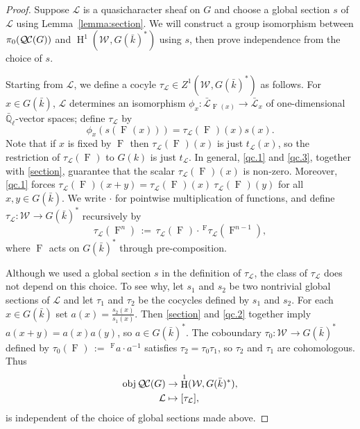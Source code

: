 \documentclass{amsart}
\theoremstyle{plain}
\theoremstyle{definition}
\theoremstyle{remark}
\newcommand{\EE}{\mathbb{\bar Q}_\ell}
\newcommand{\bFq}{\bar{k}}
\newcommand{\Weil}[1]{\mathcal{W}_{#1}}
\newcommand{\Frob}[1]{\operatorname{F}_{#1}}
\DeclareMathOperator{\Hh}{H}
\DeclareMathOperator{\obj}{obj}
\newcommand{\ceq}{{\, :=\, }}
\newcommand{\qcs}[1]{{\mathcal{#1}}}
\newcommand{\gqcs}[1]{{\mathcal{\bar #1}}}
\newcommand{\QC}{{\mathcal{Q\hskip-0.8pt C}}}
\newcommand{\QCiso}[1]{\pi_0 (\QC(#1))}
\newcommand{\trFrob}[1]{t_{#1}}
\begin{document}
\begin{proof}
  Suppose $\qcs{L}$ is a quasicharacter sheaf on $G$ and choose a global section $s$
  of $\qcs{L}$ using Lemma~\ref{lemma:section}.
  We will construct a group isomorphism between $\QCiso{G}$ and
  $\Hh^1(\Weil{}, G(\bFq)^*)$ using $s$, then prove independence from the choice of $s$.

  Starting from $\qcs{L}$, we define a cocyle $\tau_{\qcs{L}} \in Z^1(\Weil{},G(\bFq)^*)$ as follows.
  For $x \in G(\bFq)$, $\qcs{L}$ determines an isomorphism $\phi_x : \gqcs{L}_{\Frob{}(x)} \to \gqcs{L}_x$
  of one-dimensional $\EE$-vector spaces; define $\tau_\qcs{L}$ by
  \begin{equation}\label{t}
   \phi_{x}(s(\Frob{}(x))) = \tau_\qcs{L}(\Frob{})(x) s(x).
  \end{equation}
  Note that if $x$ is fixed by $\Frob{}$ then $\tau_\qcs{L}(\Frob{})(x)$ is just $\trFrob{\qcs{L}}(x)$, so the restriction of
  $\tau_\qcs{L}(\Frob{})$ to $G(k)$ is just $\trFrob{\qcs{L}}$.
  In general, \ref{qc.1} and \ref{qc.3}, together with \eqref{section}, guarantee that
  the scalar $\tau_\qcs{L}(\Frob{})(x)$ is non-zero.  Moreover, 
  \ref{qc.1} forces
  $\tau_\qcs{L}(\Frob{})(x+y) = \tau_\qcs{L}(\Frob{})(x) \ \tau_\qcs{L}(\Frob{})(y)$
  for all $x,y \in G(\bFq)$.  We write $\cdot$ for pointwise multiplication of functions, and
  define $\tau_\qcs{L} : \Weil{} \to G(\bFq)^*$ recursively by
  \[
   \tau_\qcs{L}(\Frob{}^n) \ceq \tau_\qcs{L}(\Frob{})\cdot \,^{\Frob{}} \tau_\qcs{L}(\Frob{}^{n-1}),
  \]
  where $\Frob{}$ acts on $G(\bFq)^*$ through pre-composition.

  Although we used a global section $s$ in the definition of
  $\tau_\qcs{L}$, the class of $\tau_\qcs{L}$ does not depend on this
  choice. To see why, let $s_1$ and $s_2$ be two nontrivial global sections of
  $\qcs{L}$ and let $\tau_1$ and $\tau_2$ be the cocycles defined by $s_1$ and $s_2$.
  For each $x \in G(\bFq)$ set $a(x) = \frac{s_2(x)}{s_1(x)}$.  Then \eqref{section} and
  \ref{qc.2} together imply $a(x+y) = a(x)a(y)$, so
  $a\in G(\bFq)^*$.  The coboundary $\tau_0 : \Weil{} \to G(\bFq)^*$
  defined by $\tau_0(\Frob{}) \ceq \,^{\Frob{}} a \cdot a^{-1}$ satisfies $\tau_2 = \tau_0 \tau_1$,
  so $\tau_2$ and $\tau_1$ are cohomologous. Thus
  \begin{equation}\label{cohomologous}
  \begin{split}
    \obj \QC(G) &\to \Hh^1(\Weil{},G(\bFq)^*), \\
    \qcs{L} &\mapsto [\tau_\qcs{L}],
  \end{split}
  \end{equation}
  is independent of the choice of global sections made above.


\end{proof}
\end{document}
